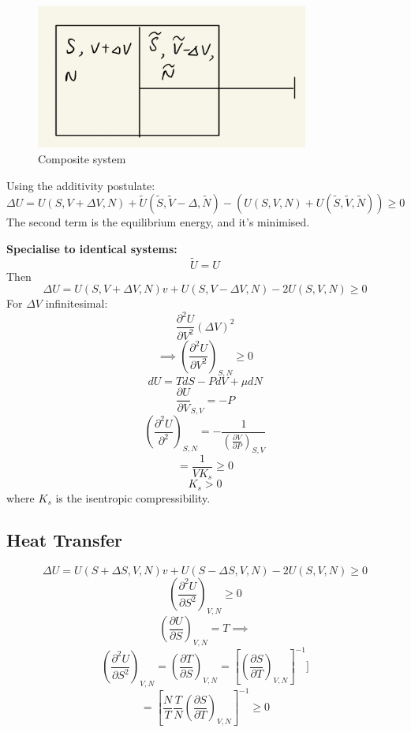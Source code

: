 \documentclass[11pt]{book}
\theoremstyle{definition}
\begin{document}
\begin{figure}[h]
	\centering
	\includegraphics[width=0.8\textwidth]{images/0702-01.png}
	\caption{Composite system}
\end{figure}

Using the additivity postulate:
\begin{equation}
	\Delta U = U(S,V + \Delta V, N) + \tilde U (\tilde S, \tilde V - \Delta , \tilde N) -  (U(S,V,N)+U(\tilde S, \tilde V, \tilde N)) \geq 0
\end{equation}
The second term is the equilibrium energy, and it's minimised.

\textbf{Specialise to identical systems:}
\[ \tilde U = U \]
Then
\[ \Delta U = U(S,V+\Delta V, N )v+ U(S,V-\Delta V,N)-2U(S,V,N) \geq 0 \] 
For $ \Delta V  $ infinitesimal:
\[ \frac{\partial ^2 U}{\partial V^2} (\Delta V)^2 \] 
\[\implies \left( \frac{\partial ^2U}{\partial V^2} \right)_{S,N} \geq 0 \]
\[ dU = TdS -PdV +\mu dN\] 
\[ \frac{\partial U}{\partial V}_{S,V} = -P \] 
\[ \left( \frac{\partial ^2U}{\partial ^2} \right)_{S,N} = - \frac{1}{ \left ( \frac{\partial V}{\partial P} \right)_{S,V} } \] 
\[ = \frac{1}{V K_s} \geq 0 \] 
\begin{equation}
	K_s > 0
\end{equation}
where $ K_s $ is the isentropic compressibility. 

\subsection{Heat Transfer}
\[ \Delta U = U(S + \Delta S,V, N )v+ U(S - \Delta S,V,N)-2U(S,V,N) \geq 0 \] 
\[ \left (\frac{\partial ^2U}{\partial S^2} \right )_{V,N} \geq 0 \] 
\[ \left (\frac{\partial U}{\partial S} \right )_{V,N} = T \implies \] 
\[ \left (\frac{\partial ^2U}{\partial S^2} \right )_{V,N} = \left (\frac{\partial T}{\partial S} \right )_{V,N} = \left[ \left (\frac{\partial S}{\partial T} \right )_{V,N} \right]^{-1} ] \] 
\[ = \left[\frac{N}{T} \frac{T}{N}\left (\frac{\partial S}{\partial T} \right )_{V,N} \right ]^{-1} \geq 0\] 
\end{document}
